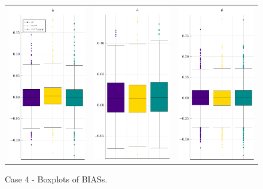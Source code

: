 \begin{figure}[H] 
	
	\centering
	\begin{tabular}[b]{c c c}
		\includegraphics[width=.3\textwidth]{Figures/4/BIAS_b.pdf} & \includegraphics[width=.3\textwidth]{Figures/4/BIAS_a.pdf} & \includegraphics[width=.3\textwidth]{Figures/4/BIAS_t.pdf}
	\end{tabular}
	\caption{Case 4 - Boxplots of BIASs.}
	\label{fig:bpBIAS4}
\end{figure}
